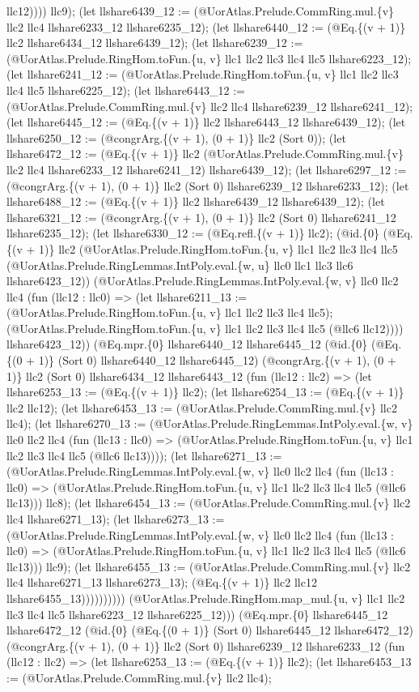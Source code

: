 \documentclass[11pt]{article}
\begin{document}
llc12)))) llc9); (let llshare6439\_12 := (@UorAtlas.Prelude.CommRing.mul.\{v\} llc2 llc4 llshare6233\_12 llshare6235\_12); (let llshare6440\_12 := (@Eq.\{(v + 1)\} llc2 llshare6434\_12 llshare6439\_12); (let llshare6239\_12 := (@UorAtlas.Prelude.RingHom.toFun.\{u, v\} llc1 llc2 llc3 llc4 llc5 llshare6223\_12); (let llshare6241\_12 := (@UorAtlas.Prelude.RingHom.toFun.\{u, v\} llc1 llc2 llc3 llc4 llc5 llshare6225\_12); (let llshare6443\_12 := (@UorAtlas.Prelude.CommRing.mul.\{v\} llc2 llc4 llshare6239\_12 llshare6241\_12); (let llshare6445\_12 := (@Eq.\{(v + 1)\} llc2 llshare6443\_12 llshare6439\_12); (let llshare6250\_12 := (@congrArg.\{(v + 1), (0 + 1)\} llc2 (Sort 0)); (let llshare6472\_12 := (@Eq.\{(v + 1)\} llc2 (@UorAtlas.Prelude.CommRing.mul.\{v\} llc2 llc4 llshare6233\_12 llshare6241\_12) llshare6439\_12); (let llshare6297\_12 := (@congrArg.\{(v + 1), (0 + 1)\} llc2 (Sort 0) llshare6239\_12 llshare6233\_12); (let llshare6488\_12 := (@Eq.\{(v + 1)\} llc2 llshare6439\_12 llshare6439\_12); (let llshare6321\_12 := (@congrArg.\{(v + 1), (0 + 1)\} llc2 (Sort 0) llshare6241\_12 llshare6235\_12); (let llshare6330\_12 := (@Eq.refl.\{(v + 1)\} llc2); (@id.\{0\} (@Eq.\{(v + 1)\} llc2 (@UorAtlas.Prelude.RingHom.toFun.\{u, v\} llc1 llc2 llc3 llc4 llc5 (@UorAtlas.Prelude.RingLemmas.IntPoly.eval.\{w, u\} llc0 llc1 llc3 llc6 llshare6423\_12)) (@UorAtlas.Prelude.RingLemmas.IntPoly.eval.\{w, v\} llc0 llc2 llc4 (fun (llc12 : llc0) => (let llshare6211\_13 := (@UorAtlas.Prelude.RingHom.toFun.\{u, v\} llc1 llc2 llc3 llc4 llc5); (@UorAtlas.Prelude.RingHom.toFun.\{u, v\} llc1 llc2 llc3 llc4 llc5 (@llc6 llc12)))) llshare6423\_12)) (@Eq.mpr.\{0\} llshare6440\_12 llshare6445\_12 (@id.\{0\} (@Eq.\{(0 + 1)\} (Sort 0) llshare6440\_12 llshare6445\_12) (@congrArg.\{(v + 1), (0 + 1)\} llc2 (Sort 0) llshare6434\_12 llshare6443\_12 (fun (llc12 : llc2) => (let llshare6253\_13 := (@Eq.\{(v + 1)\} llc2); (let llshare6254\_13 := (@Eq.\{(v + 1)\} llc2 llc12); (let llshare6453\_13 := (@UorAtlas.Prelude.CommRing.mul.\{v\} llc2 llc4); (let llshare6270\_13 := (@UorAtlas.Prelude.RingLemmas.IntPoly.eval.\{w, v\} llc0 llc2 llc4 (fun (llc13 : llc0) => (@UorAtlas.Prelude.RingHom.toFun.\{u, v\} llc1 llc2 llc3 llc4 llc5 (@llc6 llc13)))); (let llshare6271\_13 := (@UorAtlas.Prelude.RingLemmas.IntPoly.eval.\{w, v\} llc0 llc2 llc4 (fun (llc13 : llc0) => (@UorAtlas.Prelude.RingHom.toFun.\{u, v\} llc1 llc2 llc3 llc4 llc5 (@llc6 llc13))) llc8); (let llshare6454\_13 := (@UorAtlas.Prelude.CommRing.mul.\{v\} llc2 llc4 llshare6271\_13); (let llshare6273\_13 := (@UorAtlas.Prelude.RingLemmas.IntPoly.eval.\{w, v\} llc0 llc2 llc4 (fun (llc13 : llc0) => (@UorAtlas.Prelude.RingHom.toFun.\{u, v\} llc1 llc2 llc3 llc4 llc5 (@llc6 llc13))) llc9); (let llshare6455\_13 := (@UorAtlas.Prelude.CommRing.mul.\{v\} llc2 llc4 llshare6271\_13 llshare6273\_13); (@Eq.\{(v + 1)\} llc2 llc12 llshare6455\_13)))))))))) (@UorAtlas.Prelude.RingHom.map\_mul.\{u, v\} llc1 llc2 llc3 llc4 llc5 llshare6223\_12 llshare6225\_12))) (@Eq.mpr.\{0\} llshare6445\_12 llshare6472\_12 (@id.\{0\} (@Eq.\{(0 + 1)\} (Sort 0) llshare6445\_12 llshare6472\_12) (@congrArg.\{(v + 1), (0 + 1)\} llc2 (Sort 0) llshare6239\_12 llshare6233\_12 (fun (llc12 : llc2) => (let llshare6253\_13 := (@Eq.\{(v + 1)\} llc2); (let llshare6453\_13 := (@UorAtlas.Prelude.CommRing.mul.\{v\} llc2 llc4); 
\end{document}
